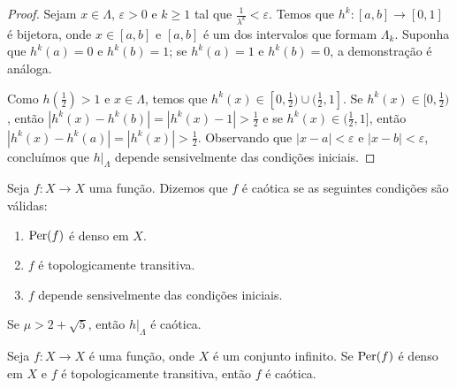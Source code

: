 \begin{proof}
Sejam $x \in \Lambda$, $\varepsilon > 0$ e $k \geq 1$ tal que $\frac{1}{\lambda^k} < \varepsilon$.
Temos que $h^k: [a, b] \to [0, 1]$ é bijetora, onde $x \in [a, b]$ e $[a, b]$ é um dos intervalos que formam $\Lambda_k$. Suponha que $h^k(a) = 0$ e $h^k(b) = 1$; se $h^k(a) = 1$ e $h^k(b) = 0$, a demonstração é análoga.

Como $h(\frac{1}{2}) > 1$ e $x \in \Lambda$, temos que $h^{k}(x) \in [0, \frac{1}{2}) \cup (\frac{1}{2}, 1]$. Se $h^{k}(x) \in [0, \frac{1}{2})$, então $|h^k(x) - h^k(b)| = |h^k(x) - 1| > \frac{1}{2}$ e se $h^{k}(x) \in (\frac{1}{2}, 1]$, então $|h^k(x) - h^k(a)| = |h^k(x)| > \frac{1}{2}$. Observando que $|x - a| < \varepsilon$ e  $|x - b| < \varepsilon$, concluímos que $h|_\Lambda$ depende sensivelmente das condições iniciais.
\end{proof}

\begin{definition}
Seja $f: X \to X$ uma função. Dizemos que $f$ é caótica se as seguintes condições são válidas:
\begin{enumerate}[label=\roman*.]
\item $\operatorname{Per}(f)$ é denso em $X$.
\item $f$ é topologicamente transitiva.
\item $f$ depende sensivelmente das condições iniciais.
\end{enumerate}
\end{definition}

\begin{theorem}
Se $\mu > 2 + \sqrt{5}$, então $h|_\Lambda$ é caótica.
\end{theorem}

\begin{theorem}
Seja $f: X \to X$ é uma função, onde $X$ é um conjunto infinito. Se $\operatorname{Per}(f)$ é denso em $X$ e $f$ é topologicamente transitiva, então $f$ é caótica.
\end{theorem}
